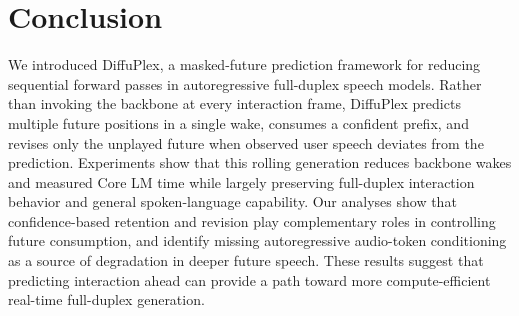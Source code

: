 \section{Conclusion}

We introduced DiffuPlex, a masked-future prediction framework for reducing sequential forward passes in autoregressive full-duplex speech models.
Rather than invoking the backbone at every interaction frame, DiffuPlex predicts multiple future positions in a single wake, consumes a confident prefix, and revises only the unplayed future when observed user speech deviates from the prediction.
Experiments show that this rolling generation reduces backbone wakes and measured Core LM time
while largely preserving full-duplex interaction behavior and general spoken-language capability.
Our analyses show that confidence-based retention and revision play complementary roles in controlling future consumption, and identify missing autoregressive audio-token conditioning as a source of degradation in deeper future speech.
These results suggest that predicting interaction ahead can provide a path toward more compute-efficient real-time full-duplex generation.
